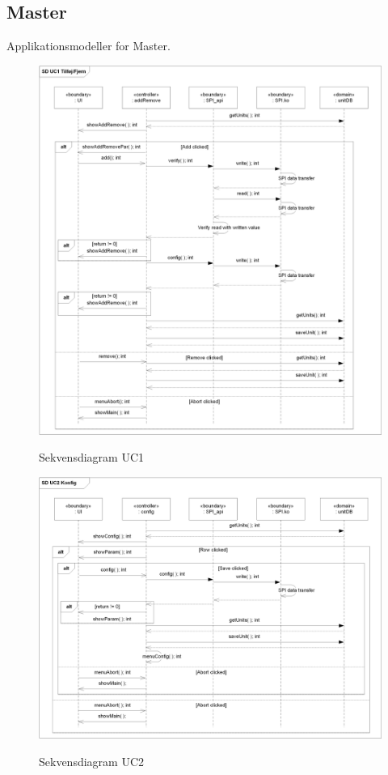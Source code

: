
\subsection{Master}
Applikationsmodeller for Master.

\begin{figure}[htbp] \centering
{\includegraphics[scale=0.8]{filer/design/a_uc1}}
\caption{Sekvensdiagram UC1}
\label{fig:Sekvensdiagram UC1}
\end{figure} 

\begin{figure}[htbp] \centering
{\includegraphics[scale=0.8]{filer/design/a_uc2}}
\caption{Sekvensdiagram UC2}
\label{fig:Sekvensdiagram UC2}
\end{figure} 

